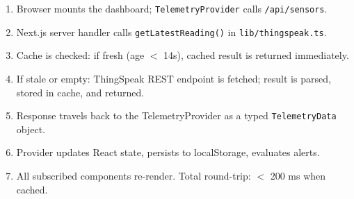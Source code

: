 \begin{enumerate}[leftmargin=1.5em]
  \item Browser mounts the dashboard; \texttt{TelemetryProvider} calls \texttt{/\allowbreak{}api/\allowbreak{}sensors}.
  \item Next.js server handler calls \texttt{getLatestReading()} in \texttt{lib/\allowbreak{}thingspeak.\allowbreak{}ts}.
  \item Cache is checked: if fresh (age $<$ 14s), cached result is returned immediately.
  \item If stale or empty: ThingSpeak REST endpoint is fetched; result is parsed, stored in cache, and returned.
  \item Response travels back to the TelemetryProvider as a typed \texttt{TelemetryData} object.
  \item Provider updates React state, persists to localStorage, evaluates alerts.
  \item All subscribed components re-render. Total round-trip: $<$ 200 ms when cached.
\end{enumerate}
